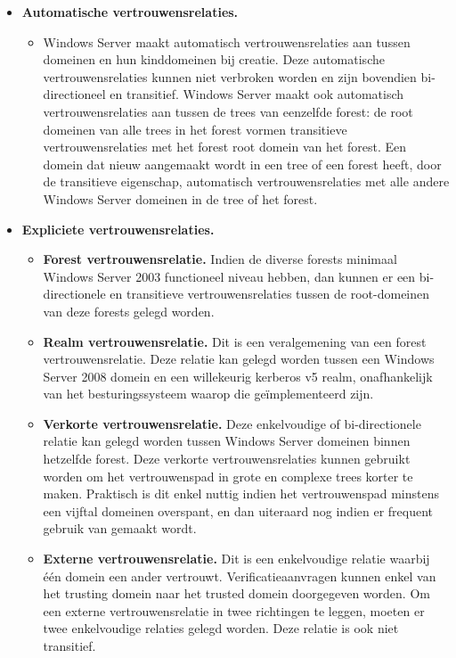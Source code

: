 \begin{enumerate}
		 { 
			\begin{itemize}
				\item \textbf{Automatische vertrouwensrelaties.}
				\begin{itemize}
					\item  Windows Server maakt automatisch vertrouwensrelaties aan tussen domeinen en hun kinddomeinen bij creatie. Deze automatische vertrouwensrelaties kunnen niet verbroken worden en zijn bovendien bi-directioneel en transitief. Windows Server maakt ook automatisch vertrouwensrelaties aan tussen de trees van eenzelfde forest: de root domeinen van alle trees in het forest vormen transitieve vertrouwensrelaties met het forest root domein van het forest. Een domein dat nieuw aangemaakt wordt in een tree of een forest heeft, door de transitieve eigenschap, automatisch vertrouwensrelaties met alle andere Windows Server domeinen in de tree of het forest.
				\end{itemize}
				\item \textbf{Expliciete vertrouwensrelaties.}
				\begin{itemize}
					\item \textbf{Forest vertrouwensrelatie.} Indien de diverse forests minimaal Windows Server 2003 functioneel niveau hebben, dan kunnen er een bi-directionele en transitieve vertrouwensrelaties tussen de root-domeinen van deze forests gelegd worden. 
					\item \textbf{Realm vertrouwensrelatie.} Dit is een veralgemening van een forest vertrouwensrelatie. Deze relatie kan gelegd worden tussen een Windows Server 2008 domein en een willekeurig kerberos v5 realm, onafhankelijk van het besturingssysteem waarop die geïmplementeerd zijn. 
					\item \textbf{Verkorte vertrouwensrelatie.} Deze enkelvoudige of bi-directionele relatie kan gelegd worden tussen Windows Server domeinen binnen hetzelfde forest. Deze verkorte vertrouwensrelaties kunnen gebruikt worden om het vertrouwenspad in grote en complexe trees korter te maken. Praktisch is dit enkel nuttig indien het vertrouwenspad minstens een vijftal domeinen overspant, en dan uiteraard nog indien er frequent gebruik van gemaakt wordt. 
					\item \textbf{Externe vertrouwensrelatie.} Dit is een enkelvoudige relatie waarbij één domein een ander vertrouwt. Verificatieaanvragen kunnen enkel van het trusting domein naar het trusted domein doorgegeven worden. Om een externe vertrouwensrelatie in twee richtingen te leggen, moeten er twee enkelvoudige relaties gelegd worden. Deze relatie is ook niet transitief.
				\end{itemize}


\end{itemize}}
\end{enumerate}
